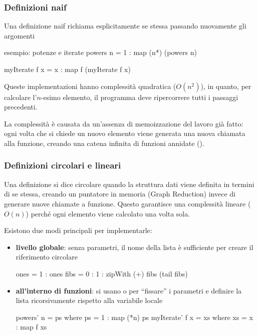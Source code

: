 \subsubsection{Definizioni naif}
Una definizione naif richiama esplicitamente se stessa passando nuovamente gli argomenti

\begin{haskellbox}{esempio: potenze e iterate}
powers n = 1 : map (n*) (powers n)

myIterate f x = x : map f (myIterate f x)
\end{haskellbox}

Queste implementazioni hanno complessità quadratica ($O(n^2)$), in quanto, per calcolare l'$n$-esimo elemento, il programma deve ripercorrere tutti i passaggi precedenti.

La complessità è causata da un'assenza di memoizzazione del lavoro già fatto: ogni volta che si chiede un nuovo elemento viene generata una nuova chiamata alla funzione, creando una catena infinita di funzioni annidate ().


\subsubsection{Definizioni circolari e lineari}
Una definizione si dice circolare quando la struttura dati viene definita in termini di se stessa, creando un puntatore in memoria (Graph Reduction) invece di generare nuove chiamate a funzione. Questo garantisce una complessità lineare ($O(n)$) perché ogni elemento viene calcolato una volta sola.

Esistono due modi principali per implementarle:
\begin{itemize}
    \item \textbf{livello globale}: senza parametri, il nome della lista è sufficiente per creare il riferimento circolare
\begin{haskellbox}{}
ones = 1 : ones
fibs = 0 : 1 : zipWith (+) fibs (tail fibs)
\end{haskellbox}
    \item \textbf{all'interno di funzioni}: si usano  o  per ``fissare'' i parametri e definire la lista ricorsivamente rispetto alla variabile locale
\begin{haskellbox}{}
powers' n = ps where ps = 1 : map (*n) ps
myIterate' f x = xs where xs = x : map f xs
\end{haskellbox}
\end{itemize}

